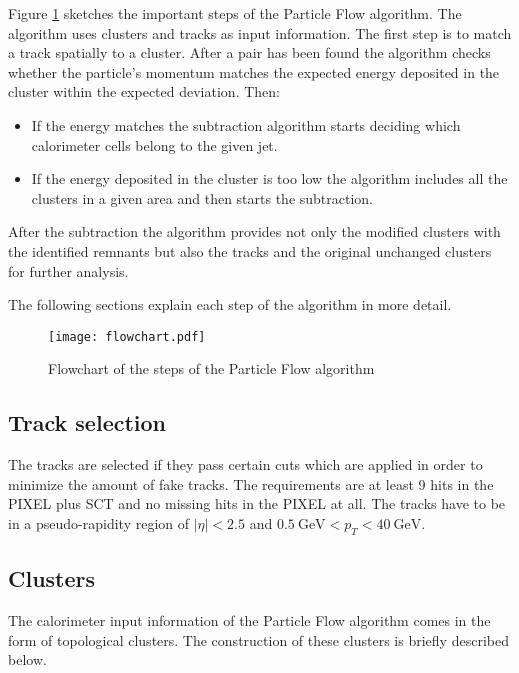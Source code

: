 Figure \ref{fig:pflowflowchart} sketches the important steps of the Particle Flow algorithm. The algorithm uses clusters and tracks as input information. The first step is to match a track spatially to a cluster. After a pair has been found the algorithm checks whether the particle's momentum matches the expected energy deposited in the cluster within the expected deviation. Then:
\begin{itemize}
\item If the energy matches the subtraction algorithm starts deciding which calorimeter cells belong to the given jet.
\item If the energy deposited in the cluster is too low the algorithm includes all the clusters in a given area and then starts the subtraction.
\end{itemize}


After the subtraction the algorithm provides not only the modified clusters with the identified remnants but also the tracks and the original unchanged clusters for further analysis.

The following sections explain each step of the algorithm in more detail.

\begin{figure}[h]
  \centering
  \texttt{[image: flowchart.pdf]}
  \caption[Flowchart of the steps of the Particle Flow algorithm]{Flowchart of the steps of the Particle Flow algorithm \cite{pflow16}}
  \label{fig:pflowflowchart}
\end{figure}

\subsection{Track selection}

The tracks are selected if they pass certain cuts which are applied in order to minimize the amount of fake tracks. The requirements are at least 9 hits in the PIXEL plus SCT and no missing hits in the PIXEL at all. The tracks have to be in a pseudo-rapidity region of $|\eta|<2.5$ and $\SI{0.5}{\GeV}<p_T<\SI{40}{\GeV}$.




\subsection{Clusters}

The calorimeter input information of the Particle Flow algorithm comes in the form of topological clusters. The construction of these clusters is briefly described below.

